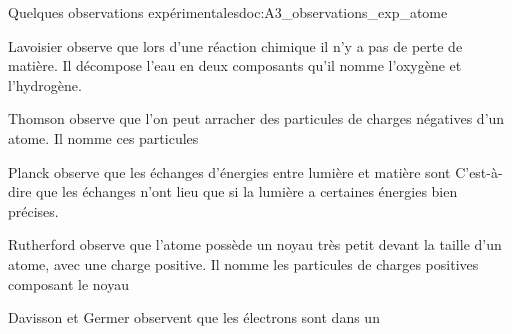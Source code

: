 \newpage
\vspace*{-36pt}
\begin{doc}{Quelques observations expérimentales}{doc:A3_observations_exp_atome}
  \begin{listePoints}
    \item {} Lavoisier observe que lors d'une réaction chimique il n'y a pas de perte de matière.
    Il décompose l'eau en deux composants qu'il nomme l'oxygène et l'hydrogène. 
    \item {} Thomson observe que l’on peut arracher des particules de charges négatives d’un atome.
    Il nomme ces particules 
    \item {} Planck observe que les échanges d'énergies entre lumière et matière sont 
    C'est-à-dire que les échanges n'ont lieu que si la lumière a certaines énergies bien précises.
    \item {} Rutherford observe que l'atome possède un noyau très petit devant la taille d’un atome, avec une charge positive.
    Il nomme les particules de charges positives composant le noyau 
    \item {} Davisson et Germer observent que les électrons sont  dans un 
  \end{listePoints}
\end{doc}

